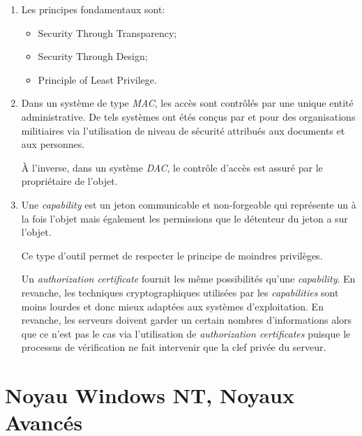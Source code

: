\begin{correction}

\begin{enumerate}
  \item
    Les principes fondamentaux sont:

    \begin{itemize}
      \item
        Security Through Transparency;
      \item
        Security Through Design;
      \item
        Principle of Least Privilege.
    \end{itemize}
  \item
    Dans un syst\`eme de type \textit{MAC}, les acc\`es sont contr\^ol\'es
    par une unique entit\'e administrative. De tels syst\`emes ont \'et\'es
    con\c{c}us par et pour des organisations militiaires via l'utilisation
    de niveau de s\'ecurit\'e attribu\'es aux documents et aux personnes.

    \`A l'inverse, dans un syst\`eme \textit{DAC}, le contr\^ole d'acc\`es
    est assur\'e par le propri\'etaire de l'objet.
  \item
    Une \textit{capability} est un jeton communicable et non-forgeable qui
    repr\'esente un \`a la fois l'objet mais \'egalement les permissions
    que le d\'etenteur du jeton a sur l'objet.

    Ce type d'outil permet de respecter le principe de moindres privil\`eges.

    Un \textit{authorization certificate} fournit les m\^eme possibilit\'es
    qu'une \textit{capability}. En revanche, les techniques cryptographiques
    utilis\'ees par les \textit{capabilities} sont moins lourdes et donc mieux
    adapt\'ees aux syst\`emes d'exploitation. En revanche, les serveurs doivent
    garder un certain nombres d'informations alors que ce n'est pas le cas
    via l'utilisation de \textit{authorization certificates} puisque le
    processus de v\'erification ne fait intervenir que la clef priv\'ee du
    serveur.
\end{enumerate}

\end{correction}

%
%

\section{Noyau Windows NT, Noyaux Avanc\'es
         }

